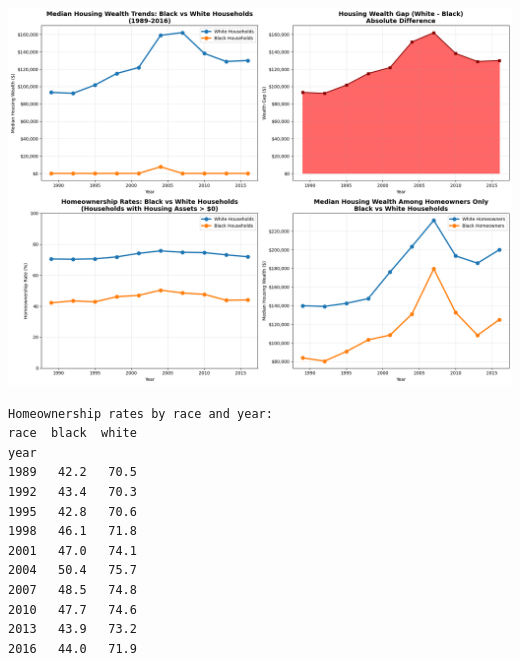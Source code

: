 \documentclass[
  letterpaper,
  DIV=11,
  numbers=noendperiod]{scrartcl}
\begin{document}
\includegraphics{main_files/figure-pdf/cell-14-output-1.png}

\begin{verbatim}
Homeownership rates by race and year:
race  black  white
year              
1989   42.2   70.5
1992   43.4   70.3
1995   42.8   70.6
1998   46.1   71.8
2001   47.0   74.1
2004   50.4   75.7
2007   48.5   74.8
2010   47.7   74.6
2013   43.9   73.2
2016   44.0   71.9
\end{verbatim}
\end{document}
